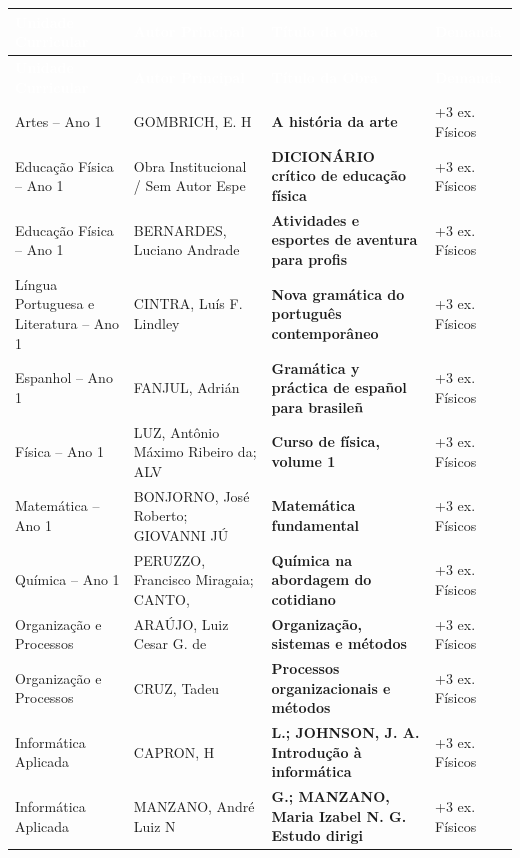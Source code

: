 \documentclass[10pt,a4paper]{article}
\begin{document}
\vspace{0.2cm}
\begin{xltabular}{\linewidth}{|p{3.8cm}|p{3.2cm}|X|p{2.2cm}|}
\hline
{}
\textcolor{white}{\textbf{Unidade Curricular}} & \textcolor{white}{\textbf{Autor Principal}} & \textcolor{white}{\textbf{Título da Obra}} & \textcolor{white}{\textbf{Demanda}} \\ \hline
\endfirsthead
\hline
{}
\textcolor{white}{\textbf{Unidade Curricular}} & \textcolor{white}{\textbf{Autor Principal}} & \textcolor{white}{\textbf{Título da Obra}} & \textcolor{white}{\textbf{Demanda}} \\ \hline
\endhead
Artes -- Ano 1 & GOMBRICH, E. H & \textbf{A história da arte} & +3 ex. Físicos \\ \hline
Educação Física -- Ano 1 & Obra Institucional / Sem Autor Espe & \textbf{DICIONÁRIO crítico de educação física} & +3 ex. Físicos \\ \hline
Educação Física -- Ano 1 & BERNARDES, Luciano Andrade & \textbf{Atividades e esportes de aventura para profis} & +3 ex. Físicos \\ \hline
Língua Portuguesa e Literatura -- Ano 1 & CINTRA, Luís F. Lindley & \textbf{Nova gramática do português contemporâneo} & +3 ex. Físicos \\ \hline
Espanhol -- Ano 1 & FANJUL, Adrián & \textbf{Gramática y práctica de español para brasileñ} & +3 ex. Físicos \\ \hline
Física -- Ano 1 & LUZ, Antônio Máximo Ribeiro da; ALV & \textbf{Curso de física, volume 1} & +3 ex. Físicos \\ \hline
Matemática -- Ano 1 & BONJORNO, José Roberto; GIOVANNI JÚ & \textbf{Matemática fundamental} & +3 ex. Físicos \\ \hline
Química -- Ano 1 & PERUZZO, Francisco Miragaia; CANTO, & \textbf{Química na abordagem do cotidiano} & +3 ex. Físicos \\ \hline
Organização e Processos & ARAÚJO, Luiz Cesar G. de & \textbf{Organização, sistemas e métodos} & +3 ex. Físicos \\ \hline
Organização e Processos & CRUZ, Tadeu & \textbf{Processos organizacionais e métodos} & +3 ex. Físicos \\ \hline
Informática Aplicada & CAPRON, H & \textbf{L.; JOHNSON, J. A. Introdução à informática} & +3 ex. Físicos \\ \hline
Informática Aplicada & MANZANO, André Luiz N & \textbf{G.; MANZANO, Maria Izabel N. G. Estudo dirigi} & +3 ex. Físicos \\ \hline

\end{xltabular}
\end{document}
